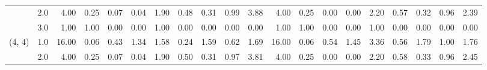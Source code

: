 \begin{tabular}{llrrrrrrrrrrrrrrrrrr}
       & 2.0 &               4.00 &                     0.25 &                                 0.07 &                             0.04 &                           1.90 &                                               0.48 &                                            0.31 &                                            0.99 &                                        3.88 &               4.00 &                     0.25 &                                 0.00 &                             0.00 &                           2.20 &                                               0.57 &                                            0.32 &                                            0.96 &                                        2.39 \\
       & 3.0 &               1.00 &                     1.00 &                                 0.00 &                             0.00 &                           1.00 &                                               0.00 &                                            0.00 &                                            0.00 &                                        0.00 &               1.00 &                     1.00 &                                 0.00 &                             0.00 &                           1.00 &                                               0.00 &                                            0.00 &                                            0.00 &                                        0.00 \\
(4, 4) & 1.0 &              16.00 &                     0.06 &                                 0.43 &                             1.34 &                           1.58 &                                               0.24 &                                            1.59 &                                            0.62 &                                        1.69 &              16.00 &                     0.06 &                                 0.54 &                             1.45 &                           3.36 &                                               0.56 &                                            1.79 &                                            1.00 &                                        1.76 \\
       & 2.0 &               4.00 &                     0.25 &                                 0.07 &                             0.04 &                           1.90 &                                               0.50 &                                            0.31 &                                            0.97 &                                        3.81 &               4.00 &                     0.25 &                                 0.00 &                             0.00 &                           2.20 &                                               0.58 &                                            0.33 &                                            0.96 &                                        2.45 \\

\end{tabular}
